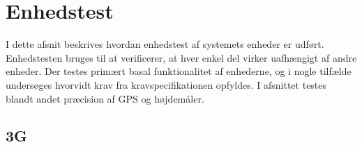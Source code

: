 \chapter{Enhedstest}
I dette afsnit beskrives hvordan enhedstest af systemets enheder er udført. Enhedstesten bruges til at verificerer, at hver enkel del virker uafhængigt af andre enheder. 
Der testes primært basal funktionalitet af enhederne, og i nogle tilfælde undersøges hvorvidt krav fra kravspecifikationen opfyldes. I afsnittet testes blandt andet præcision af GPS og højdemåler.

\section{3G}

\newpage


\newpage


\newpage 


\newpage

